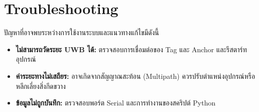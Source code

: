 \section{Troubleshooting}
ปัญหาที่อาจพบระหว่างการใช้งานระบบและแนวทางแก้ไขมีดังนี้

\begin{itemize}
    \item \textbf{ไม่สามารถวัดระยะ UWB ได้:} ตรวจสอบการเชื่อมต่อของ Tag และ Anchor และรีสตาร์ทอุปกรณ์
    \item \textbf{ค่าระยะทางไม่เสถียร:} อาจเกิดจากสัญญาณสะท้อน (Multipath) ควรปรับตำแหน่งอุปกรณ์หรือหลีกเลี่ยงสิ่งกีดขวาง
    \item \textbf{ข้อมูลไม่ถูกบันทึก:} ตรวจสอบพอร์ต Serial และการทำงานของสคริปต์ Python
\end{itemize}